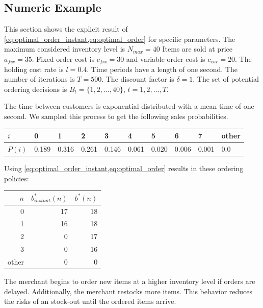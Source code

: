 \subsection{Numeric Example}
\label{section:order_example}
This section shows the explicit result of \cref{eq:optimal_order_instant,eq:optimal_order} for specific parameters.
The maximum considered inventory level is $N_{max} = 40$
Items are sold at price $a_{fix} = 35$.
Fixed order cost is $c_{fix} = 30$ and variable order cost is $c_{var} = 20$.
The holding cost rate is $l = 0.4$.
Time periods have a length of one second.
The number of iterations is $T = 500$.
The discount factor is $\delta = 1$.
The set of potential ordering decisions is $B_t = \{1, 2, \ldots, 40\}$, $t = 1, 2, \ldots, T$.

The time between customers is exponential distributed with a mean time of one second.
We sampled this process to get the following sales probabilities.

\begin{table}
\centering
\begin{tabular}{llllllllll}
	\toprule
	$i$ & 0 & 1 & 2 & 3 & 4 & 5 & 6 & 7 & other \\
	\midrule
	$P(i)$ & 0.189 & 0.316 & 0.261 & 0.146 & 0.061 & 0.020 & 0.006 & 0.001 & 0.0\\
	\bottomrule
\end{tabular}
\end{table}

Using \cref{eq:optimal_order_instant,eq:optimal_order} results in these ordering policies:

\begin{table}
	\centering
	\begin{tabular}{rrr}
		\toprule
		$n$ & $b^*_{instant}(n)$ & $b^*(n)$ \\
		\midrule
		0 & 17 & 18 \\
		1 & 16 & 18 \\
		2 & 0 & 17 \\
		3 & 0 & 16\\
		other & 0 & 0 \\
		\bottomrule
	\end{tabular}
\end{table}

The merchant begins to order new items at a higher inventory level if orders are delayed.
Additionally, the merchant restocks more items.
This behavior reduces the risks of an stock-out until the ordered items arrive.

